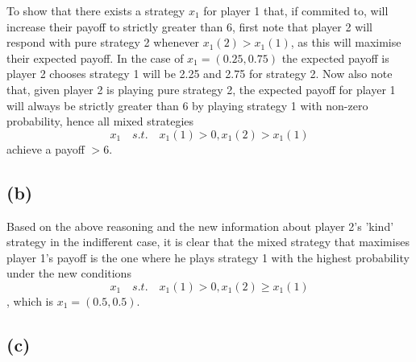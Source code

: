 \documentclass[11pt]{article}
\begin{document}
To show that there exists a strategy $x_1$ for player 1 that, if commited to, will increase their payoff to strictly greater than 6, first note that player 2 will respond with pure strategy 2 whenever $x_1(2) > x_1(1)$, as this will maximise their expected payoff. In the case of $x_1 = (0.25, 0.75)$ the expected payoff is player 2 chooses strategy 1 will be 2.25 and 2.75 for strategy 2. Now also note that, given player 2 is playing pure strategy 2, the expected payoff for player 1 will always be strictly greater than 6 by playing strategy 1 with non-zero probability, hence all mixed strategies $$x_1 \quad s.t. \quad x_1(1) > 0, x_1(2) > x_1(1)$$ achieve a payoff $> 6$.

\subsection*{(b)}

Based on the above reasoning and the new information about player 2's 'kind' strategy in the indifferent case, it is clear that the mixed strategy that maximises player 1's payoff is the one where he plays strategy 1 with the highest probability under the new conditions $$x_1 \quad s.t. \quad x_1(1) > 0, x_1(2) \geq x_1(1)$$, which is $x_1 = (0.5, 0.5)$.

\subsection*{(c)}
\end{document}
